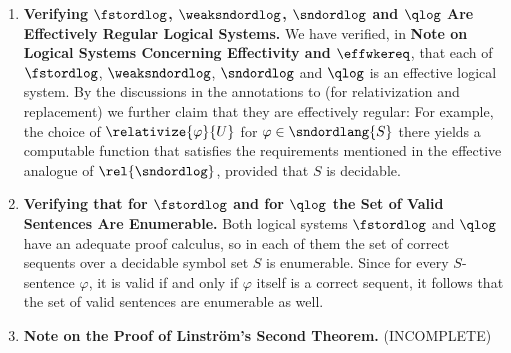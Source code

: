 \begin{enumerate}[1.]
%
\item \textbf{Verifying $\fstordlog$, $\weaksndordlog$, $\sndordlog$ and $\qlog$ Are Effectively Regular Logical Systems.} We have verified, in \textbf{Note on Logical Systems Concerning Effectivity and $\effwkereq$}, that each of $\fstordlog$, $\weaksndordlog$, $\sndordlog$ and $\qlog$ is an effective logical system. By the discussions in the annotations to  (for relativization and replacement) we further claim that they are effectively regular: For example, the choice of $\relativize{\varphi}{U}$ for $\varphi \in \sndordlang{S}$ there yields a computable function that satisfies the requirements mentioned in the effective analogue of $\rel{\sndordlog}$, provided that $S$ is decidable.
%
\item \textbf{Verifying that for $\fstordlog$ and for $\qlog$ the Set of Valid Sentences Are Enumerable.} Both logical systems $\fstordlog$ and $\qlog$ have an adequate proof calculus, so in each of them the set of correct sequents over a decidable symbol set $S$ is enumerable. Since for every $S$-sentence $\varphi$, it is valid if and only if $\varphi$ itself is a correct sequent, it follows that the set of valid sentences are enumerable as well.
%
\item \textbf{Note on the Proof of Linstr\"{o}m's Second Theorem.} (INCOMPLETE)
\end{enumerate}
